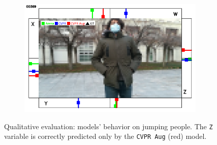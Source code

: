 \begin{figure}[H]
\begin{center}
\begin{subfigure}[h]{0.49\textwidth}
		\end{subfigure}
		\hfill
		\begin{subfigure}[h]{0.49\textwidth}
			\centering
			\includegraphics[width=0.98\textwidth]{"contents/images/qualitative-videos/jump2-square02-369"}
		\end{subfigure}
	\end{center}
	\vspace{-0.5cm}
	\caption[Qualitative evaluation: models' behavior on jumping people]{Qualitative evaluation: models' behavior on jumping people. The \texttt{Z} variable is correctly predicted only by the \texttt{CVPR Aug} (red) model.}
	\label{fig:ql-sim-jump}
\end{figure}

